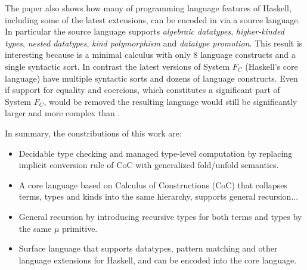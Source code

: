 The paper also shows how many of programming language features of Haskell, 
including some of the latest extensions, can be encoded in \name via 
a source language. In particular the source language supports 
\emph{algebraic datatypes}, \emph{higher-kinded types}, 
\emph{nested datatypes}, \emph{kind polymorphism} and 
\emph{datatype promotion}. 
This result is interesting because \name is a minimal calculus
with only 8 language constructs and a single syntactic sort. In contrast
the latest versions of System $F_{C}$ (Haskell's core language) 
have multiple syntactic sorts and dozens of language constructs. 
Even if support for equality and coercions, which 
constitutes a significant part of System $F_{C}$, would be removed
the resulting language would still be significantly larger and more 
complex than \name. 





In summary, the constributions of this work are:

\begin{itemize}

\item Decidable type checking and managed type-level computation by
  replacing implicit conversion rule of CoC with generalized
  \textsf{fold}/\textsf{unfold} semantics.

\item A core language based on Calculus of Constructions (CoC) that
  collapses terms, types and kinds into the same hierarchy, supports
  general recursion...

\item General recursion by introducing recursive types for both terms
  and types by the same $\mu$ primitive.

\item Surface language that supports datatypes, pattern matching and
  other language extensions for Haskell, and can be encoded into the
  core language.

\end{itemize}




